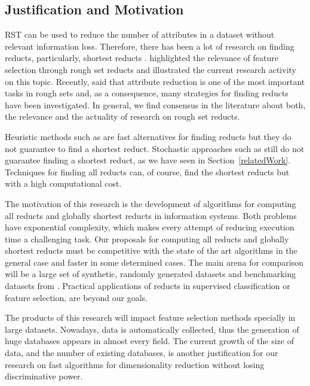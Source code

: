 \documentclass[authoryear,11pt]{elsarticle}
\begin{document}
\subsection{Justification and Motivation}\label{Justification}
  RST can be used to reduce the number of attributes in a dataset without relevant information loss. 
  Therefore, there has been a lot of research on finding reducts, particularly, shortest 
  reducts \citep{Jensen14}. \cite{Zheng14} highlighted the relevance of feature selection through rough
  set reducts and illustrated the current research activity on this topic. Recently, \cite{Jiang15} said that 
  attribute reduction is one of the most important tasks in rough sets and, as a consequence,  many strategies 
  for finding reducts have been investigated. In general, we find consensus in the literature about both,
  the relevance and the actuality of research on rough set reducts.
  
  Heuristic methods such as \citep{Chouchoulas01,Jensen04,Zhong01} are fast alternatives for finding 
  reducts but they do not guarantee to find a shortest reduct. Stochastic approaches such as \citep{Wroblewski95,
  Jensen03,Chen10,Wang07} still do not guarantee finding a shortest reduct, as we have seen in 
  Section~\ref{relatedWork}. Techniques for finding all reducts \citep{Starzyk99,WangP07} can, of course, find 
  the shortest reducts but with a high computational cost.
  
  The motivation of this research is the development of algorithms for computing all reducts and 
  globally shortest reducts in information systems. Both problems have exponential complexity, which 
  makes every attempt of reducing execution time a challenging task.
  Our proposals for computing all reducts and globally shortest reducts must be competitive with the state of 
  the art algorithms in the general case and faster in some determined cases. The main arena for comparison 
  will be a large set of synthetic, randomly generated datasets and benchmarking datasets from \citep{Bache13}. 
  Practical applications of reducts in supervised classification or feature selection, are beyond our goals.
  
  The products of this research will impact feature selection methods specially in large datasets.
  Nowadays, data is automatically collected, thus the generation of huge databases appears in almost every 
  field. The current growth of the size of data, and the number of existing databases, is another justification 
  for our research on fast algorithms for dimensionality reduction without losing discriminative power.  
  
\end{document}
